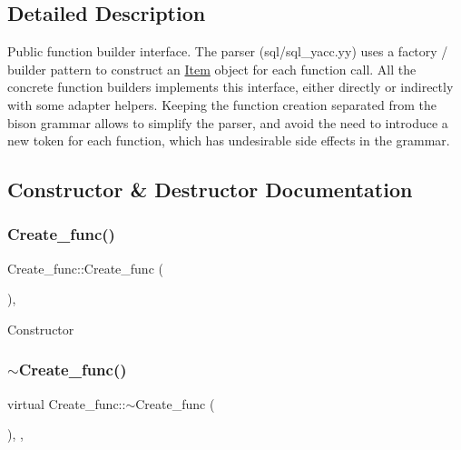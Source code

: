 \subsection{Detailed Description}
Public function builder interface. The parser (sql/sql\+\_\+yacc.\+yy) uses a factory / builder pattern to construct an {\ttfamily \mbox{\hyperlink{classItem}{Item}}} object for each function call. All the concrete function builders implements this interface, either directly or indirectly with some adapter helpers. Keeping the function creation separated from the bison grammar allows to simplify the parser, and avoid the need to introduce a new token for each function, which has undesirable side effects in the grammar. 

\subsection{Constructor \& Destructor Documentation}
\mbox{\label{classCreate__func_ac010933937e5d5bb116bdf948f5ba48e}} 
\subsubsection{\texorpdfstring{Create\+\_\+func()}{Create\_func()}}
{\footnotesize\ttfamily Create\+\_\+func\+::\+Create\+\_\+func (\begin{DoxyParamCaption}{ }\end{DoxyParamCaption})\hspace{0.3cm}{\ttfamily [inline]}, {\ttfamily [protected]}}

Constructor \mbox{\label{classCreate__func_a5d42932df08fda80ffe9d5ee275f4bdf}} 
\subsubsection{\texorpdfstring{$\sim$\+Create\+\_\+func()}{~Create\_func()}}
{\footnotesize\ttfamily virtual Create\+\_\+func\+::$\sim$\+Create\+\_\+func (\begin{DoxyParamCaption}{ }\end{DoxyParamCaption})\hspace{0.3cm}{\ttfamily [inline]}, {\ttfamily [protected]}, {\ttfamily [virtual]}}

